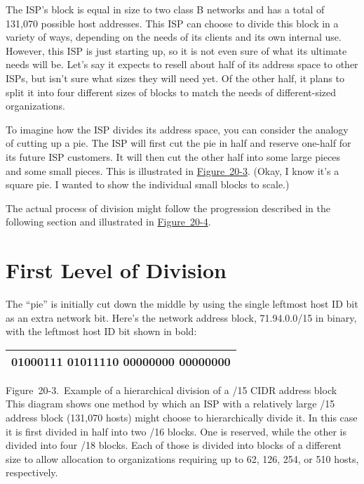 The ISP's block is equal in size to two class B networks and has a total
of 131,070 possible host addresses. This ISP can choose to divide this
block in a variety of ways, depending on the needs of its clients and
its own internal use. However, this ISP is just starting up, so it is
not even sure of what its ultimate needs will be. Let's say it expects
to resell about half of its address space to other ISPs, but isn't sure
what sizes they will need yet. Of the other half, it plans to split it
into four different sizes of blocks to match the needs of
different-sized organizations.

To imagine how the ISP divides its address space, you can consider the
analogy of cutting up a pie. The ISP will first cut the pie in half and
reserve one-half for its future ISP customers. It will then cut the
other half into some large pieces and some small pieces. This is
illustrated in
\protect\hyperlink{ch20s04.htmlux5cux23example_of_a_hierarchical_division_of_a_}{Figure~20-3}.
(Okay, I know it's a square pie. I wanted to show the individual small
blocks to scale.)

The actual process of division might follow the progression described in
the following section and illustrated in
\protect\hyperlink{ch20s04.htmlux5cux23hierarchical_address_division_using_cidr}{Figure~20-4}.

\section{First Level of Division}

The ``pie'' is initially cut down the middle by using the single leftmost
host ID bit as an extra network bit. Here's the network address block,
71.94.0.0/15 in binary, with the leftmost host ID bit shown in bold:

\begin{longtable}[]{@{}l@{}}
\toprule
\endhead
01000111 0101111{\textbf{0}} 00000000 00000000\tabularnewline
\bottomrule
\end{longtable}





Figure~20-3.~Example of a hierarchical division of a /15 CIDR address
block This diagram shows one method by which an ISP with a relatively
large /15 address block (131,070 hosts) might choose to hierarchically
divide it. In this case it is first divided in half into two /16 blocks.
One is reserved, while the other is divided into four /18 blocks. Each
of those is divided into blocks of a different size to allow allocation
to organizations requiring up to 62, 126, 254, or 510 hosts,
respectively.

